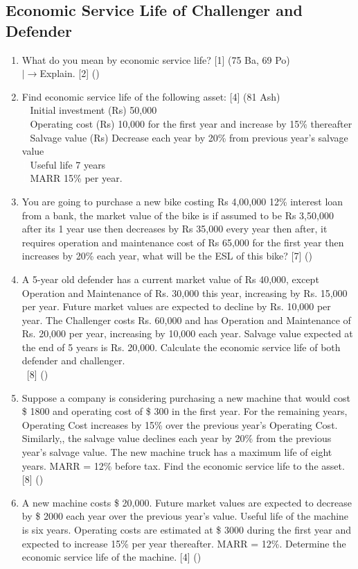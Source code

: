 \documentclass[12pt]{article}
\newcommand{\lb}{\\ $\left|\rightarrow\right.$}
\newcommand{\enter}{\\\textcolor{white}{1}}
\begin{document}
	\subsection{Economic Service Life of Challenger and Defender}
		\begin{enumerate}
			\item What do you mean by economic service life? \hfill [1] (75 Ba, 69 Po)
			\lb Explain. \hfill [2] ()

			\item Find economic service life of the following asset: \hfill [4] (81 Ash) \enter
			Initial investment (Rs) 50,000 \enter
			Operating cost (Rs) 10,000 for the first year and increase by 15\% thereafter \enter
			Salvage value (Rs) Decrease each year by 20\% from previous year's salvage value \enter
			Useful life 7 years \enter
			MARR 15\% per year.

			\item You are going to purchase a new bike costing Rs 4,00,000 12\% interest loan from a bank, the market value of the bike is if assumed to be Rs 3,50,000 after its 1 year use then decreases by Rs 35,000 every year then after, it requires operation and maintenance cost of Rs 65,000 for the first year then increases by 20\% each year, what will be the ESL of this bike? \hfill [7] ()

			\item A 5-year old defender has a current market value of Rs 40,000, except Operation and Maintenance of Rs. 30,000 this year, increasing by Rs. 15,000 per year. Future market values are expected to decline by Rs. 10,000 per year. The Challenger costs Rs. 60,000 and has Operation and Maintenance of Rs. 20,000 per year, increasing by 10,000 each year. Salvage value expected at the end of 5 years is Rs. 20,000. Calculate the economic service life of both defender and challenger.
			\enter\hfill [8] ()

			\item Suppose a company is considering purchasing a new machine that would cost \$ 1800 and operating cost of \$ 300 in the first year. For the remaining years, Operating Cost increases by 15\% over the previous year's Operating Cost. Similarly,, the salvage value declines each year by 20\% from the previous year's salvage value. The new machine truck has a maximum life of eight years. MARR = 12\% before tax. Find the economic service life to the asset. \hfill [8] ()

			\item A new machine costs \$ 20,000. Future market values are expected to decrease by \$ 2000 each year over the previous year's value. Useful life of the machine is six years. Operating costs are estimated at \$ 3000 during the first year and expected to increase 15\% per year thereafter. MARR = 12\%. Determine the economic service life of the machine. \hfill [4] ()


\end{enumerate}
\end{document}
